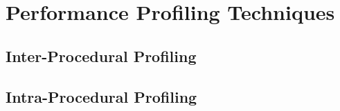 \chapter{Performance Profiling Techniques}

\section{Inter-Procedural Profiling}

\section{Intra-Procedural Profiling}